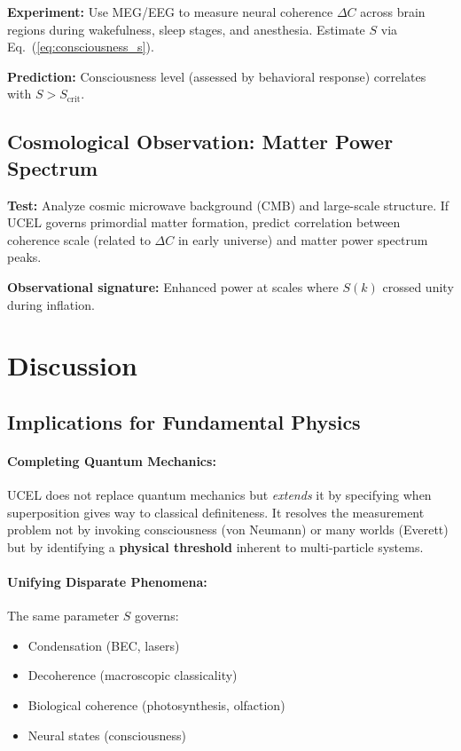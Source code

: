 \documentclass[12pt,a4paper]{article}
\begin{document}
\textbf{Experiment:} Use MEG/EEG to measure neural coherence $\Delta C$ across brain regions during wakefulness, sleep stages, and anesthesia. Estimate $S$ via Eq.~(\ref{eq:consciousness_s}).

\textbf{Prediction:} Consciousness level (assessed by behavioral response) correlates with $S > S_{\text{crit}}$.

\subsection{Cosmological Observation: Matter Power Spectrum}

\textbf{Test:} Analyze cosmic microwave background (CMB) and large-scale structure. If UCEL governs primordial matter formation, predict correlation between coherence scale (related to $\Delta C$ in early universe) and matter power spectrum peaks.

\textbf{Observational signature:} Enhanced power at scales where $S(k)$ crossed unity during inflation.

\section{Discussion}
\label{sec:discussion}

\subsection{Implications for Fundamental Physics}

\paragraph{Completing Quantum Mechanics:}
UCEL does not replace quantum mechanics but \emph{extends} it by specifying when superposition gives way to classical definiteness. It resolves the measurement problem not by invoking consciousness (von Neumann) or many worlds (Everett) but by identifying a \textbf{physical threshold} inherent to multi-particle systems.

\paragraph{Unifying Disparate Phenomena:}
The same parameter $S$ governs:
\begin{itemize}
    \item Condensation (BEC, lasers)
    \item Decoherence (macroscopic classicality)
    \item Biological coherence (photosynthesis, olfaction)
    \item Neural states (consciousness)
\end{itemize}
\end{document}
